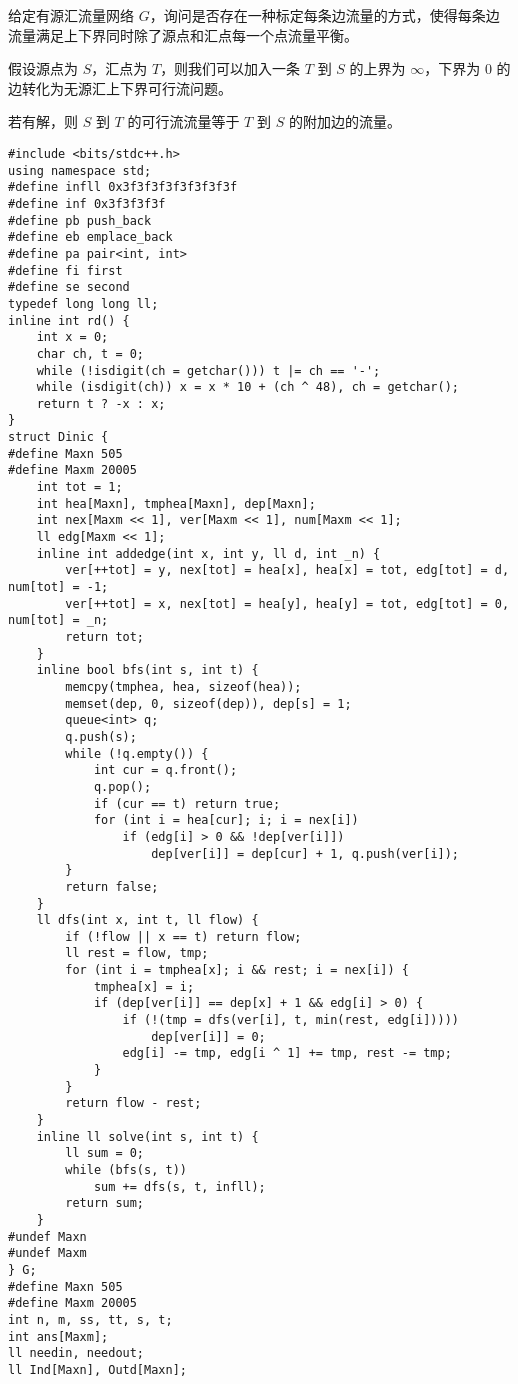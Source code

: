 给定有源汇流量网络 $G$，询问是否存在一种标定每条边流量的方式，使得每条边流量满足上下界同时除了源点和汇点每一个点流量平衡。

假设源点为 $S$，汇点为 $T$，则我们可以加入一条 $T$ 到 $S$ 的上界为 $\infty$，下界为 $0$ 的边转化为无源汇上下界可行流问题。

若有解，则 $S$ 到 $T$ 的可行流流量等于 $T$ 到 $S$ 的附加边的流量。

\begin{verbatim}
#include <bits/stdc++.h>
using namespace std;
#define infll 0x3f3f3f3f3f3f3f3f
#define inf 0x3f3f3f3f
#define pb push_back
#define eb emplace_back
#define pa pair<int, int>
#define fi first
#define se second
typedef long long ll;
inline int rd() {
    int x = 0;
    char ch, t = 0;
    while (!isdigit(ch = getchar())) t |= ch == '-';
    while (isdigit(ch)) x = x * 10 + (ch ^ 48), ch = getchar();
    return t ? -x : x;
}
struct Dinic {
#define Maxn 505
#define Maxm 20005
    int tot = 1;
    int hea[Maxn], tmphea[Maxn], dep[Maxn];
    int nex[Maxm << 1], ver[Maxm << 1], num[Maxm << 1];
    ll edg[Maxm << 1];
    inline int addedge(int x, int y, ll d, int _n) {
        ver[++tot] = y, nex[tot] = hea[x], hea[x] = tot, edg[tot] = d, num[tot] = -1;
        ver[++tot] = x, nex[tot] = hea[y], hea[y] = tot, edg[tot] = 0, num[tot] = _n;
        return tot;
    }
    inline bool bfs(int s, int t) {
        memcpy(tmphea, hea, sizeof(hea));
        memset(dep, 0, sizeof(dep)), dep[s] = 1;
        queue<int> q;
        q.push(s);
        while (!q.empty()) {
            int cur = q.front();
            q.pop();
            if (cur == t) return true;
            for (int i = hea[cur]; i; i = nex[i])
                if (edg[i] > 0 && !dep[ver[i]])
                    dep[ver[i]] = dep[cur] + 1, q.push(ver[i]);
        }
        return false;
    }
    ll dfs(int x, int t, ll flow) {
        if (!flow || x == t) return flow;
        ll rest = flow, tmp;
        for (int i = tmphea[x]; i && rest; i = nex[i]) {
            tmphea[x] = i;
            if (dep[ver[i]] == dep[x] + 1 && edg[i] > 0) {
                if (!(tmp = dfs(ver[i], t, min(rest, edg[i]))))
                    dep[ver[i]] = 0;
                edg[i] -= tmp, edg[i ^ 1] += tmp, rest -= tmp;
            }
        }
        return flow - rest;
    }
    inline ll solve(int s, int t) {
        ll sum = 0;
        while (bfs(s, t))
            sum += dfs(s, t, infll);
        return sum;
    }
#undef Maxn
#undef Maxm
} G;
#define Maxn 505
#define Maxm 20005
int n, m, ss, tt, s, t;
int ans[Maxm];
ll needin, needout;
ll Ind[Maxn], Outd[Maxn];

\end{verbatim}
